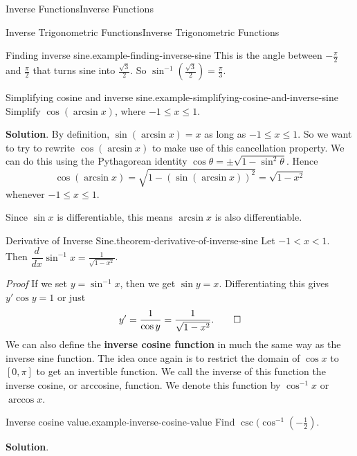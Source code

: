 \documentclass[10pt,]{book}
\makeatletter
\newcommand{\terminology}[1]{\textbf{#1}}
\renewcommand*{\proofname}{Proof}
\renewenvironment{proof}[1][\proofname]{\par
  \pushQED{\qed}%
  \normalfont \topsep6\p@\@plus6\p@\relax
  \trivlist
  \item\relax
    {\itshape
    #1\@addpunct{.}}\hspace\labelsep\ignorespaces
}{%
  \popQED\endtrivlist\@endpefalse
}
\numberwithin{equation}{section}
\newcommand{\dv}[3][]{\dfrac{d^{#1} #2}{d #3^{#1}}}
\makeatother
\begin{document}
\begin{chapterptx}{Inverse Functions}{}{Inverse Functions}{}{}
\begin{sectionptx}{Inverse Trigonometric Functions}{}{Inverse Trigonometric Functions}{}{}
\begin{example}{Finding inverse sine.}{example-finding-inverse-sine}
This is the angle between \(-\frac{\pi}{2}\) and \(\frac{\pi}{2}\) that turns sine into \(\frac{\sqrt{3}}{2}\). So \(\sin^{-1}(\frac{\sqrt{3}}{2}) = \frac{\pi}{3}\).%
\end{example}
\begin{example}{Simplifying cosine and inverse sine.}{example-simplifying-cosine-and-inverse-sine}%
\hypertarget{p-263}{}%
Simplify \(\cos(\arcsin x)\), where \(-1\leq x\leq 1\).%
\par\smallskip%
\noindent\textbf{Solution}.\hypertarget{solution-57}{}\quad%
\hypertarget{p-264}{}%
By definition, \(\sin(\arcsin x) = x\) as long as \(-1\leq x\leq 1\). So we want to try to rewrite \(\cos(\arcsin x)\) to make use of this cancellation property. We can do this using the Pythagorean identity \(\cos \theta = \pm\sqrt{1-\sin^{2}\theta}\). Hence%
\begin{equation*}
\cos(\arcsin x) = \sqrt{1-(\sin(\arcsin x))^{2}} = \sqrt{1 - x^{2}}
\end{equation*}
whenever \(-1\leq x\leq 1\).%
\end{example}
\hypertarget{p-265}{}%
Since \(\sin x\) is differentiable, this means \(\arcsin x\) is also differentiable.%
\begin{theorem}{Derivative of Inverse Sine.}{}{theorem-derivative-of-inverse-sine}%
\hypertarget{p-266}{}%
Let \(-1 < x < 1\). Then \(\dv{}{x}\sin^{-1}x = \frac{1}{\sqrt{1-x^{2}}}\).%
\end{theorem}
\begin{proof}\hypertarget{proof-6}{}
\hypertarget{p-267}{}%
If we set \(y = \sin^{-1}x\), then we get \(\sin y = x\). Differentiating this gives \(y'\cos y = 1\) or just%
\begin{equation*}
y' = \frac{1}{\cos y} = \frac{1}{\sqrt{1-x^{2}}}.\qedhere
\end{equation*}
%
\end{proof}
\hypertarget{p-268}{}%
We can also define the \terminology{inverse cosine function} in much the same way as the inverse sine function. The idea once again is to restrict the domain of \(\cos x\) to \([0,\pi]\) to get an invertible function. We call the inverse of this function the inverse cosine, or arccosine, function. We denote this function by \(\cos^{-1}x\) or \(\arccos x\).%
\begin{example}{Inverse cosine value.}{example-inverse-cosine-value}%
\hypertarget{p-269}{}%
Find \(\csc(\cos^{-1}(-\frac{1}{2})\).%
\par\smallskip%
\noindent\textbf{Solution}.\hypertarget{solution-58}{}\quad%

\end{example}
\end{sectionptx}
\end{chapterptx}
\end{document}
